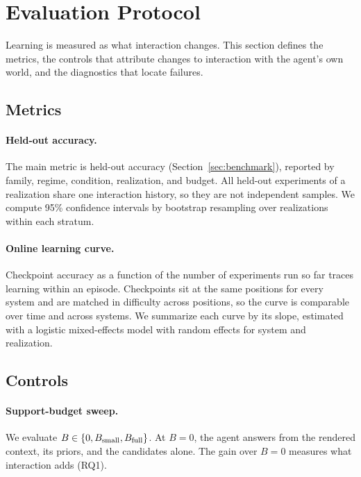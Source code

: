 \section{Evaluation Protocol}
\label{sec:protocol}

Learning is measured as what interaction changes. This section defines the metrics, the controls that attribute changes to interaction with the agent's own world, and the diagnostics that locate failures.

\subsection{Metrics}

\paragraph{Held-out accuracy.} The main metric is held-out accuracy (Section~\ref{sec:benchmark}), reported by family, regime, condition, realization, and budget. All held-out experiments of a realization share one interaction history, so they are not independent samples. We compute 95\% confidence intervals by bootstrap resampling over realizations within each stratum. 

\paragraph{Online learning curve.} Checkpoint accuracy as a function of the number of experiments run so far traces learning within an episode. Checkpoints sit at the same positions for every system and are matched in difficulty across positions, so the curve is comparable over time and across systems. We summarize each curve by its slope, estimated with a logistic mixed-effects model with random effects for system and realization.

\subsection{Controls}
\label{sec:protocol:ablations}

\paragraph{Support-budget sweep.} We evaluate $B \in \{0,B_{\rm small},B_{\rm full}\}$. At $B=0$, the agent answers from the rendered context, its priors, and the candidates alone. The gain over $B=0$ measures what interaction adds (RQ1).

